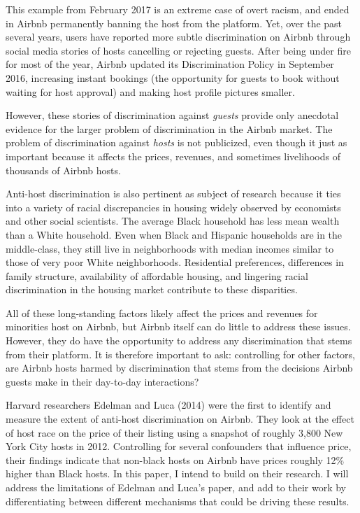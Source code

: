 \documentclass[11pt, oneside]{article}
\begin{document}
This example from February 2017 is an extreme case of overt racism, and ended in Airbnb permanently banning the host from the platform. Yet, over the past several years, users have reported more subtle discrimination on Airbnb through social media stories of hosts cancelling or rejecting guests.\cite{nyt1} After being under fire for most of the year, Airbnb updated its Discrimination Policy in September 2016, increasing instant bookings (the opportunity for guests to book without waiting for host approval) and making host profile pictures smaller.\cite{nyt2} 

However, these stories of discrimination against \textit{guests} provide only anecdotal evidence for the larger problem of discrimination in the Airbnb market. The problem of discrimination against \textit{hosts} is not publicized, even though it just as important because it affects the prices, revenues, and sometimes livelihoods of thousands of Airbnb hosts. 

Anti-host discrimination is also pertinent as subject of research because it ties into a variety of racial discrepancies in housing widely observed by economists and other social scientists. The average Black household has less mean wealth than a White household.\cite{oliver} Even when Black and Hispanic households are in the middle-class, they still live in neighborhoods with median incomes similar to those of very poor White neighborhoods.\cite{reardon} Residential preferences, differences in family structure, availability of affordable housing, and lingering racial discrimination in the housing market contribute to these disparities.\cite{krysan}  

All of these long-standing factors likely affect the prices and revenues for minorities host on Airbnb, but Airbnb itself can do little to address these issues. However, they do have the opportunity to address any discrimination that stems from their platform. It is therefore important to ask: controlling for other factors, are Airbnb hosts harmed by discrimination that stems from the decisions Airbnb guests make in their day-to-day interactions? 

Harvard researchers Edelman and Luca (2014) were the first to identify and measure the extent of anti-host discrimination on Airbnb.\cite{edelman} They look at the effect of host race on the price of their listing using a snapshot of roughly 3,800 New York City hosts in 2012. Controlling for several confounders that influence price, their findings indicate that non-black hosts on Airbnb have prices roughly 12\% higher than Black hosts. In this paper, I intend to build on their research. I will address the limitations of Edelman and Luca's paper, and add to their work by differentiating between different mechanisms that could be driving these results.  
\end{document}
